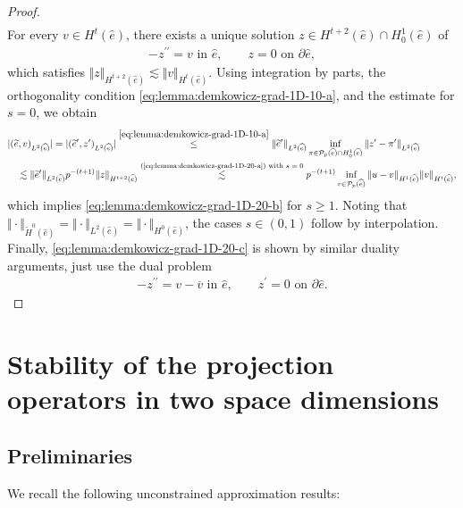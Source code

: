 \documentclass{article}
\begin{document}
\begin{proof}
\begin{align*}
\end{align*}
For every $v\in H^t(\widehat{e})$, there exists a unique solution $z\in H^{t+2}(\widehat{e}) \cap H_0^1(\widehat{e})$ of 
\begin{align*}
-z^{\prime\prime} = v \text{ in } \widehat{e}, \qquad z=0 \text{ on }\partial\widehat{e},
\end{align*}
which satisfies $\Vert z\Vert_{H^{t+2}(\widehat{e})} \lesssim \Vert v\Vert_{H^t(\widehat{e})}$. 
Using integration by parts, the orthogonality condition \eqref{eq:lemma:demkowicz-grad-1D-10-a}, 
and the estimate for $s=0$, we obtain 
\begin{align*}
&|(\widetilde{e},v)_{L^2(\widehat{e})}| = |(\widetilde{e}^\prime,z^\prime)_{L^2(\widehat{e})}| 
\stackrel{\eqref{eq:lemma:demkowicz-grad-1D-10-a}}{ \leq }
\Vert\widetilde{e}^\prime\Vert_{L^2(\widehat{e})} \operatorname*{inf}_{\pi\in\mathcal{P}_p(\widehat{e}) \cap H_0^1(\widehat{e})} \Vert z^\prime-\pi^\prime\Vert_{L^2(\widehat{e})} \\
&\quad \lesssim \Vert \widetilde e^\prime \Vert_{L^2(\widehat{e})} p^{-(t+1)} \Vert z\Vert_{H^{t+2}(\widehat{e})} 
\stackrel{\text{(\ref{eq:lemma:demkowicz-grad-1D-20-a}) with $s = 0$}}{\lesssim} 
p^{-(t+1)} \inf_{v \in {\mathcal P}_p(\widehat e)} \Vert u - v \Vert_{H^1(\widehat{e})} \Vert v\Vert_{H^t(\widehat{e})},
\end{align*}
which implies {\eqref{eq:lemma:demkowicz-grad-1D-20-b}} for $s\ge 1$.
Noting that $\Vert\cdot\Vert_{\widetilde H^0(\widehat e)} = \Vert\cdot\Vert_{L^2(\widehat e)} = \Vert\cdot\Vert_{H^0(\widehat e)}$, the cases  $s \in(0,1)$ follow by interpolation.
Finally, \eqref{eq:lemma:demkowicz-grad-1D-20-c} is shown by similar duality arguments, just use the dual problem
\begin{align*}
-z^{\prime\prime} = v-\overline{v} \text{ in } \widehat{e}, \qquad z^\prime = 0 \text{ on }\partial\widehat{e}.
\end{align*}
\end{proof}

\section{Stability of the projection operators in two space dimensions}

\subsection{Preliminaries}
We recall the following unconstrained approximation results:
\end{document}
